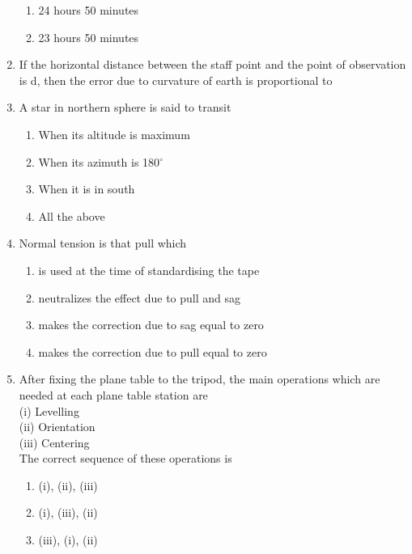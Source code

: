 \documentclass[11pt,a4paper]{article}
\begin{document}
\begin{enumerate}
\begin{enumerate}[label=\Alph*.]
\item{24 hours 50 minutes}
\item{23 hours 50 minutes}
\end{enumerate}
\item{If the horizontal distance between the staff point and the point of observation is d, then the error due to curvature of earth is proportional to}
\\
\item{A star in northern sphere is said to transit}
\begin{enumerate}[label=\Alph*.]
\item{When its altitude is maximum}
\item{When its azimuth is 180$^\circ$}
\item{When it is in south}
\item{All the above}
\end{enumerate}
\item{Normal tension is that pull which}
\begin{enumerate}[label=\Alph*.]
\item{is used at the time of standardising the tape}
\item{neutralizes the effect due to pull and sag}
\item{makes the correction due to sag equal to zero}
\item{makes the correction due to pull equal to zero}
\end{enumerate}
\item{After fixing the plane table to the tripod, the main operations which are needed at each plane table station are \\
 (i) Levelling \\
 (ii) Orientation \\
 (iii) Centering \\
The correct sequence of these operations is
}
\begin{enumerate}[label=\Alph*.]
\item{(i), (ii), (iii)}
\item{(i), (iii), (ii)}
\item{(iii), (i), (ii)}

\end{enumerate}
\end{enumerate}
\end{document}
